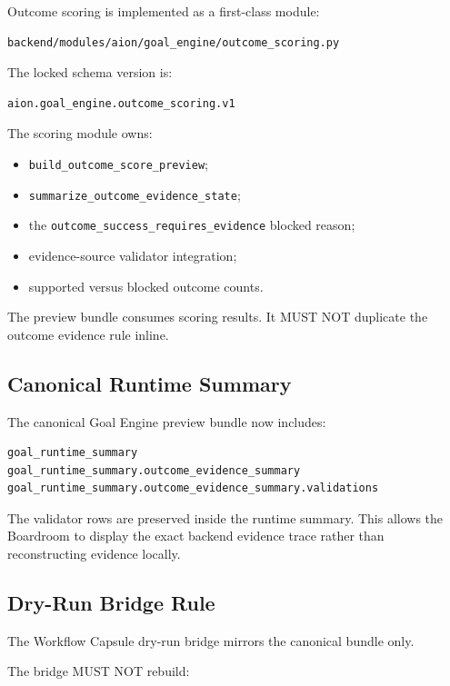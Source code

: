 Outcome scoring is implemented as a first-class module:

\begin{verbatim}
backend/modules/aion/goal_engine/outcome_scoring.py
\end{verbatim}

The locked schema version is:

\begin{verbatim}
aion.goal_engine.outcome_scoring.v1
\end{verbatim}

The scoring module owns:

\begin{itemize}
  \item \texttt{build\_outcome\_score\_preview};
  \item \texttt{summarize\_outcome\_evidence\_state};
  \item the \texttt{outcome\_success\_requires\_evidence} blocked reason;
  \item evidence-source validator integration;
  \item supported versus blocked outcome counts.
\end{itemize}

The preview bundle consumes scoring results. It MUST NOT duplicate the outcome evidence rule inline.

\subsection{Canonical Runtime Summary}

The canonical Goal Engine preview bundle now includes:

\begin{verbatim}
goal_runtime_summary
goal_runtime_summary.outcome_evidence_summary
goal_runtime_summary.outcome_evidence_summary.validations
\end{verbatim}

The validator rows are preserved inside the runtime summary. This allows the Boardroom to display the exact backend evidence trace rather than reconstructing evidence locally.

\subsection{Dry-Run Bridge Rule}

The Workflow Capsule dry-run bridge mirrors the canonical bundle only.

The bridge MUST NOT rebuild:

